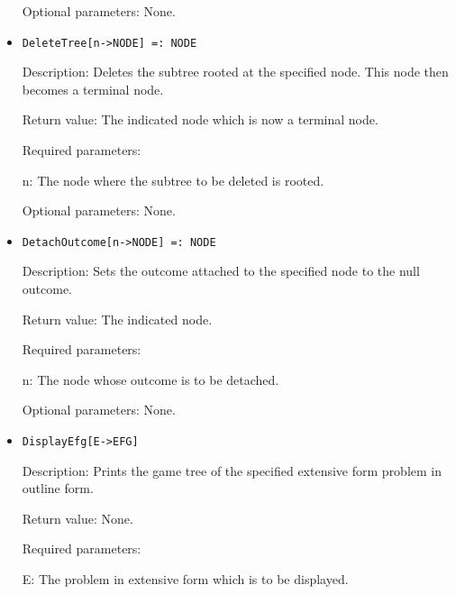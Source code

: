 \begin{itemize}
\item
[Optional parameters:] None.
\ed

\item
\protect \large \begin{verbatim}
DeleteTree[n->NODE] =: NODE
\end{verbatim}\normalsize

\bd
\item
[Description:] Deletes the subtree rooted at the specified node.  This
node then becomes a terminal node.
\item
[Return value:] The indicated node which is now a terminal node.
\item
[Required parameters:]\hfil\null

\bd
\item  
[n:] The node where the subtree to be deleted is rooted.
\ed

\item
[Optional parameters:] None.
\ed

\item
\protect \large \begin{verbatim}
DetachOutcome[n->NODE] =: NODE
\end{verbatim}\normalsize

\bd
\item
[Description:] Sets the outcome attached to the specified node to the
null outcome.
\item   
[Return value:] The indicated node.
\item
[Required parameters:]\hfil\null

\bd
\item	
[n:] The node whose outcome is to be detached.
\ed

\item
[Optional parameters:] None.
\ed

\item
\protect \large \begin{verbatim}
DisplayEfg[E->EFG]
\end{verbatim}\normalsize

\bd
\item
[Description:] Prints the game tree of the specified extensive form
problem in outline form.
\item
[Return value:] None.
\item
[Required parameters:]\hfil\null

\bd
\item
[E:] The problem in extensive form which is to be displayed.
\ed


\end{itemize}
